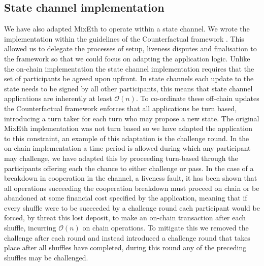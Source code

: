 \documentclass[conference, compsoc]{IEEEtran}
\theoremstyle{definition}
\begin{document}
\subsection{State channel implementation} \label{statechannelimpl}

We have also adapted MixEth to operate within a state channel. We wrote the implementation within the guidelines of the Counterfactual framework \cite{coleman2018counterfactual}. This allowed us to delegate the processes of setup, liveness disputes and finalisation to the framework so that we could focus on adapting the application logic. Unlike the on-chain implementation the state channel implementation requires that the set of participants be agreed upon upfront. In state channels each update to the state needs to be signed by all other participants, this means that state channel applications are inherently at least $\mathcal{O}(n)$. To co-ordinate these off-chain updates the Counterfactual framework enforces that all applications be turn based, introducing a turn taker for each turn who may propose a new state. The original MixEth implementation was not turn based so we have adapted the application to this constraint, an example of this adaptation is the challenge round. In the on-chain implementation a time period is allowed during which any participant may challenge, we have adapted this by proceeding turn-based through the participants offering each the chance to either challenge or pass. In the case of a breakdown in cooperation in the channel, a liveness fault, it has been shown that all operations succeeding the cooperation breakdown must proceed on chain\cite{mccorryyou} or be abandoned at some financial cost specified by the application, meaning that if every shuffle were to be succeeded by a challenge round each participant would be forced, by threat this lost deposit, to make an on-chain transaction after each shuffle, incurring $\mathcal{O}(n)$ on chain operations. To mitigate this we removed the challenge after each round and instead introduced a challenge round that takes place after all shuffles have completed, during this round any of the preceding shuffles may be challenged.
\end{document}
